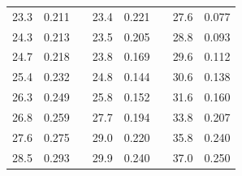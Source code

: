 \documentclass[a4paper,12pt]{article} %
\begin{document}
\begin{table}[h!]
\begin{tabular}{cclcclcc}
				\multicolumn{1}{|c|}{23.3}               & \multicolumn{1}{c|}{0.211} & \multicolumn{1}{l|}{} & \multicolumn{1}{c|}{23.4}       & \multicolumn{1}{c|}{0.221} & \multicolumn{1}{l|}{} & \multicolumn{1}{c|}{27.6}       & \multicolumn{1}{c|}{0.077} \\ \cline{1-2} \cline{4-5} \cline{7-8} 
				\multicolumn{1}{|c|}{24.3}               & \multicolumn{1}{c|}{0.213} & \multicolumn{1}{l|}{} & \multicolumn{1}{c|}{23.5}       & \multicolumn{1}{c|}{0.205} & \multicolumn{1}{l|}{} & \multicolumn{1}{c|}{28.8}       & \multicolumn{1}{c|}{0.093} \\ \cline{1-2} \cline{4-5} \cline{7-8} 
				\multicolumn{1}{|c|}{24.7}               & \multicolumn{1}{c|}{0.218} & \multicolumn{1}{l|}{} & \multicolumn{1}{c|}{23.8}       & \multicolumn{1}{c|}{0.169} & \multicolumn{1}{l|}{} & \multicolumn{1}{c|}{29.6}       & \multicolumn{1}{c|}{0.112} \\ \cline{1-2} \cline{4-5} \cline{7-8} 
				\multicolumn{1}{|c|}{25.4}               & \multicolumn{1}{c|}{0.232} & \multicolumn{1}{l|}{} & \multicolumn{1}{c|}{24.8}       & \multicolumn{1}{c|}{0.144} & \multicolumn{1}{l|}{} & \multicolumn{1}{c|}{30.6}       & \multicolumn{1}{c|}{0.138} \\ \cline{1-2} \cline{4-5} \cline{7-8} 
				\multicolumn{1}{|c|}{26.3}               & \multicolumn{1}{c|}{0.249} & \multicolumn{1}{l|}{} & \multicolumn{1}{c|}{25.8}       & \multicolumn{1}{c|}{0.152} & \multicolumn{1}{l|}{} & \multicolumn{1}{c|}{31.6}       & \multicolumn{1}{c|}{0.160} \\ \cline{1-2} \cline{4-5} \cline{7-8} 
				\multicolumn{1}{|c|}{26.8}               & \multicolumn{1}{c|}{0.259} & \multicolumn{1}{l|}{} & \multicolumn{1}{c|}{27.7}       & \multicolumn{1}{c|}{0.194} & \multicolumn{1}{l|}{} & \multicolumn{1}{c|}{33.8}       & \multicolumn{1}{c|}{0.207} \\ \cline{1-2} \cline{4-5} \cline{7-8} 
				\multicolumn{1}{|c|}{27.6}               & \multicolumn{1}{c|}{0.275} & \multicolumn{1}{l|}{} & \multicolumn{1}{c|}{29.0}       & \multicolumn{1}{c|}{0.220} & \multicolumn{1}{l|}{} & \multicolumn{1}{c|}{35.8}       & \multicolumn{1}{c|}{0.240} \\ \cline{1-2} \cline{4-5} \cline{7-8} 
				\multicolumn{1}{|c|}{28.5}               & \multicolumn{1}{c|}{0.293} & \multicolumn{1}{l|}{} & \multicolumn{1}{c|}{29.9}       & \multicolumn{1}{c|}{0.240} & \multicolumn{1}{l|}{} & \multicolumn{1}{c|}{37.0}       & \multicolumn{1}{c|}{0.250} \\ \cline{1-2} \cline{4-5} \cline{7-8} 

\end{tabular}
\end{table}
\end{document}
